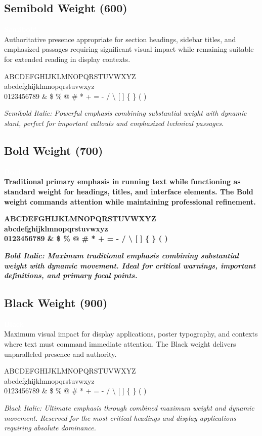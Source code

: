 \documentclass[11pt,letterpaper]{article}
\newcommand{\showcaseweight}[2]{%
    \noindent\colorbox{spacetimeblack}{\textcolor{white}{\textbf{#1}}}\\[2pt]
    #2
}
\begin{document}
\subsection{Semibold Weight (600)}

{\semiboldfont
\showcaseweight{Semibold}{
Authoritative presence appropriate for section headings, sidebar titles, and emphasized passages requiring significant visual impact while remaining suitable for extended reading in display contexts.

ABCDEFGHIJKLMNOPQRSTUVWXYZ\\
abcdefghijklmnopqrstuvwxyz\\
0123456789 \& \$ \% @ \# * + = - / \textbackslash{} [ ] \{ \} ( )
}

\textit{Semibold Italic: Powerful emphasis combining substantial weight with dynamic slant, perfect for important callouts and emphasized technical passages.}
}

\subsection{Bold Weight (700)}

\showcaseweight{\textbf{Bold}}{
\textbf{Traditional primary emphasis in running text while functioning as standard weight for headings, titles, and interface elements. The Bold weight commands attention while maintaining professional refinement.}

\textbf{ABCDEFGHIJKLMNOPQRSTUVWXYZ\\
abcdefghijklmnopqrstuvwxyz\\
0123456789 \& \$ \% @ \# * + = - / \textbackslash{} [ ] \{ \} ( )}

\textbf{\textit{Bold Italic: Maximum traditional emphasis combining substantial weight with dynamic movement. Ideal for critical warnings, important definitions, and primary focal points.}}
}

\subsection{Black Weight (900)}

{\blackfont
\showcaseweight{Black}{
Maximum visual impact for display applications, poster typography, and contexts where text must command immediate attention. The Black weight delivers unparalleled presence and authority.

ABCDEFGHIJKLMNOPQRSTUVWXYZ\\
abcdefghijklmnopqrstuvwxyz\\
0123456789 \& \$ \% @ \# * + = - / \textbackslash{} [ ] \{ \} ( )
}

\textit{Black Italic: Ultimate emphasis through combined maximum weight and dynamic movement. Reserved for the most critical headings and display applications requiring absolute dominance.}
}
\end{document}
